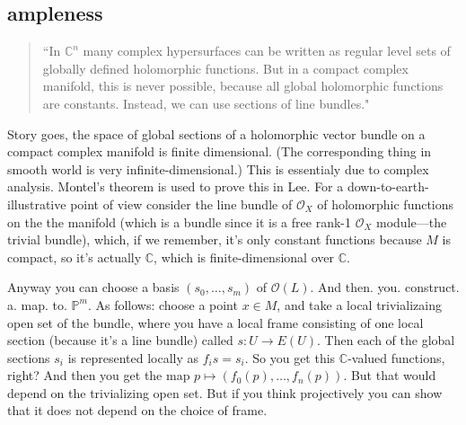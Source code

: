 \subsection{ampleness}

\begin{quotation}
	``In \(\mathbb{C}^n\) many complex hypersurfaces can be written as regular level sets of globally defined holomorphic functions. But in a compact complex manifold, this is never possible, because all global holomorphic functions are constants. Instead, we can use sections of line bundles."
\end{quotation}

Story goes, the space of global sections of a holomorphic vector bundle on a compact complex manifold is finite dimensional. (The corresponding thing in smooth world is very infinite-dimensional.) This is essentialy due to complex analysis. Montel's theorem is used to prove this in Lee. For a down-to-earth-illustrative point of view consider the line bundle of \(\mathcal{O}_X\) of holomorphic functions on the the manifold (which is a bundle since it is a free rank-1 \(\mathcal{O}_X\) module---the trivial bundle), which, if we remember, it's only constant functions because \(M\) is compact, so it's actually \(\mathbb{C}\), which is finite-dimensional over \(\mathbb{C}\).

Anyway you can choose a basis \((s_0,\ldots,s_m)\) of \(\mathcal{O}(L)\). And then. you. construct. a. map. to. \(\mathbb{P}^m\). As follows: choose a point \(x \in M\), and take a local trivializaing open set of the bundle, where you have a local frame consisting of one local section (because it's a line bundle) called \(s: U \to E(U)\). Then each of the global sections \(s_i\) is represented locally as \(f_is=s_i\). So you get this \(\mathbb{C}\)-valued functions, right? And then you get the map \(p \mapsto (f_0(p),\ldots,f_n(p))\). But that would depend on the trivializing open set. But if you think projectively you can show that it does not depend on the choice of frame.

